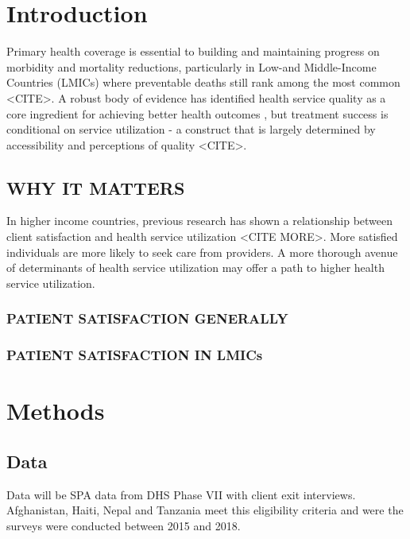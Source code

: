 \section{Introduction}

Primary health coverage is essential to building and maintaining progress on morbidity and mortality reductions, particularly in Low-and Middle-Income Countries (LMICs) where preventable deaths still rank among the most common <CITE>. A robust body of evidence has identified health service quality as a core ingredient for achieving better health outcomes \autocite{world_health_organization_delivering_2018}, but treatment success is conditional on service utilization - a construct that is largely determined by accessibility and perceptions of quality <CITE>.

\subsection{WHY IT MATTERS} %

In higher income countries, previous research has shown a relationship between client satisfaction and health service utilization \autocite{zastowny_patient_1989} <CITE MORE>. More satisfied individuals are more likely to seek care from providers. A more thorough avenue of determinants of health service utilization may offer a path to higher health service utilization.

\subsubsection{PATIENT SATISFACTION GENERALLY}

\subsubsection{PATIENT SATISFACTION IN LMICs}




\section{Methods}

\subsection{Data}

Data will be SPA data from DHS Phase VII with client exit interviews. Afghanistan, Haiti, Nepal and Tanzania meet this eligibility criteria and were the surveys were conducted between 2015 and 2018.

